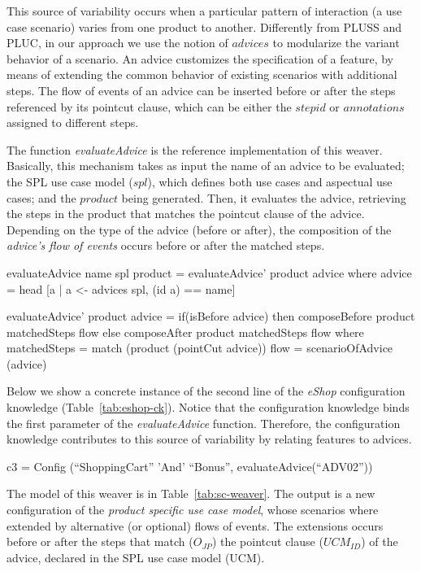 This source of variability occurs when a particular pattern of interaction (a use case scenario) varies from one product to another. Differently from PLUSS and PLUC, in our approach we use the notion of $advices$ to modularize the variant behavior of a scenario. An advice customizes the specification of a feature, by means of extending the common behavior of existing scenarios with additional steps. The flow of events of an advice can be inserted before or after the steps referenced by its pointcut clause, which can be either the $step id$ or $annotations$ assigned to different steps.

The function \emph{evaluateAdvice} is the reference implementation of this weaver. Basically, this mechanism takes as input the name of an advice to be evaluated; the SPL use case model ($spl$), which defines both use cases and aspectual use cases; and the $product$ being generated. Then, it evaluates the advice, retrieving the steps in the product that matches the pointcut clause of the advice. Depending on the type of the advice (before or after), the composition of the \emph{advice's flow of events} occurs before or after the matched steps.

\begin{code}
evaluateAdvice name spl product =
  evaluateAdvice' product advice
  where
  advice = head [a | a <- advices spl, (id a) == name]

evaluateAdvice' product advice =
  if(isBefore advice)
    then composeBefore product matchedSteps flow
    else composeAfter product matchedSteps flow
  where
  matchedSteps = match (product (pointCut advice))
  flow = scenarioOfAdvice (advice)
\end{code}

Below we show a concrete instance of the second line of the \emph{eShop} configuration knowledge (Table~\ref{tab:eshop-ck}). Notice that the configuration knowledge binds the first parameter of the \emph{evaluateAdvice} function. Therefore, the configuration knowledge contributes to this source of variability by relating features to advices.

\begin{code}
c3 = Config (``ShoppingCart'' 'And' ``Bonus'',
   evaluateAdvice(``ADV02''))
\end{code}

The model of this weaver is in Table~\ref{tab:sc-weaver}. The output is a new configuration of the \emph{product specific use case model}, whose scenarios where extended by alternative (or optional) flows of events. The extensions occurs before or after the steps that match ($O_{JP}$) the pointcut clause ($UCM_{ID}$) of the advice, declared in the SPL use case model (UCM).

